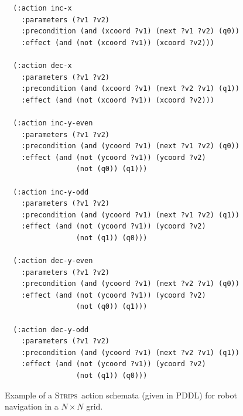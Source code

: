 \documentclass[letterpaper]{article} %
\newcommand{\strips}{\textsc{Strips}}     %
\begin{document}


\begin{figure}
  \begin{tiny}
  \begin{verbatim}
  (:action inc-x
    :parameters (?v1 ?v2)
    :precondition (and (xcoord ?v1) (next ?v1 ?v2) (q0))
    :effect (and (not (xcoord ?v1)) (xcoord ?v2)))

  (:action dec-x
    :parameters (?v1 ?v2)
    :precondition (and (xcoord ?v1) (next ?v2 ?v1) (q1))
    :effect (and (not (xcoord ?v1)) (xcoord ?v2)))

  (:action inc-y-even
    :parameters (?v1 ?v2)
    :precondition (and (ycoord ?v1) (next ?v1 ?v2) (q0))
    :effect (and (not (ycoord ?v1)) (ycoord ?v2)
                 (not (q0)) (q1)))

  (:action inc-y-odd
    :parameters (?v1 ?v2)
    :precondition (and (ycoord ?v1) (next ?v1 ?v2) (q1))
    :effect (and (not (ycoord ?v1)) (ycoord ?v2)
                 (not (q1)) (q0)))

  (:action dec-y-even
    :parameters (?v1 ?v2)
    :precondition (and (ycoord ?v1) (next ?v2 ?v1) (q0))
    :effect (and (not (ycoord ?v1)) (ycoord ?v2)
                 (not (q0)) (q1)))

  (:action dec-y-odd
    :parameters (?v1 ?v2)
    :precondition (and (ycoord ?v1) (next ?v2 ?v1) (q1))
    :effect (and (not (ycoord ?v1)) (ycoord ?v2)
                 (not (q1)) (q0)))
  \end{verbatim}
  \end{tiny}
 \caption{\small Example of a \strips\ action schemata (given in PDDL) for robot navigation in a $N\times N$ grid.}
   \label{fig:model-example}
\end{figure}
\end{document}
